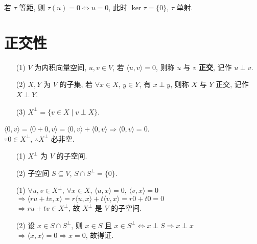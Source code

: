 \documentclass{note}
\begin{document}
若 $\tau$ 等距, 则 $\tau(u)=0\Longleftrightarrow u=0$, 此时 $\ker\tau=\{0\}$, $\tau$ 单射.

\section{正交性}
\begin{df}[正交]
    \begin{itemize}
        \item[(1)] $V$ 为内积向量空间, $u,v\in V$, 若 $\langle u,v\rangle=0$, 则称 $u$ 与 $v$ \textbf{正交}, 记作 $u\perp v$.
        \item[(2)] $X,Y$ 为 $V$ 的子集, 若 $\forall x\in X$, $y\in Y$, 有 $x\perp y$, 则称 $X$ 与 $Y$ 正交, 记作 $X\perp Y$.
        \item[(3)] $X^{\perp}=\{v\in X\mid v\perp X\}$.
    \end{itemize}
\end{df}

$\langle 0,v\rangle=\langle 0+0,v\rangle=\langle 0,v\rangle+\langle 0,v\rangle\Longrightarrow\langle 0,v\rangle=0$.\\
$\because 0\in X^{\perp}$, $\therefore X^{\perp}$ 必非空.

\begin{thm}[(课本定理 9.7)]
    \begin{itemize}
        \item[(1)] $X^{\perp}$ 为 $V$ 的子空间.
        \item[(2)] 子空间 $S\subseteq V$, $S\cap S^{\perp}=\{0\}$.
    \end{itemize}
\end{thm}
\begin{pf}
    \begin{itemize}
        \item[(1)] $\forall u,v\in X^{\perp}$, $\forall x\in X$, $\langle u,x\rangle=0$, $\langle v,x\rangle=0$\\
        $\Longrightarrow\langle ru+tv,x\rangle=r\langle u,x\rangle+t\langle v,x\rangle=r0+t0=0$\\
        $\Longrightarrow ru+tv\in X^{\perp}$, 故 $X^{\perp}$ 是 $V$ 的子空间.
        \item[(2)] 设 $x\in S\cap S^{\perp}$, 则 $x\in S$ 且 $x\in S^{\perp}\Longleftrightarrow x\perp S\Longrightarrow x\perp x$\\
        $\Longrightarrow\langle x,x\rangle=0\Longrightarrow x=0$, 故得证.
    \end{itemize}
\end{pf}
\end{document}
